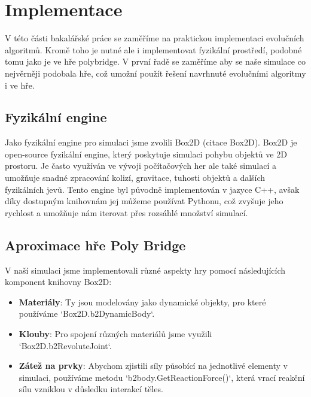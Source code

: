 \chapter{Implementace}

V této části bakalářské práce se zaměříme na praktickou implementaci evolučních algoritmů. Kromě toho je nutné ale i implementovat fyzikální prostředí, podobné tomu jako je ve hře polybridge. V první řadě se zaměříme aby se naše simulace co nejvěrněji podobala hře, což umožní použít řešení navrhnuté evolučními algoritmy i ve hře. 




\section{Fyzikální engine}

Jako fyzikální engine pro simulaci jsme zvolili Box2D (citace Box2D). Box2D je open-source fyzikální engine, který poskytuje simulaci pohybu objektů ve 2D prostoru. Je často využíván ve vývoji počítačových her ale také simulací a umožňuje snadné zpracování kolizí, gravitace, tuhosti objektů a dalších fyzikálních jevů. Tento engine byl původně implementován v jazyce C++, avšak díky dostupným knihovnám jej můžeme používat Pythonu, což zvyšuje jeho rychlost a umožňuje nám iterovat přes rozsáhlé množství simulací.

\section{Aproximace hře Poly Bridge}

V naší simulaci jsme implementovali různé aspekty hry pomocí následujících komponent knihovny Box2D:

\begin{itemize}
    \item \textbf{Materiály}: Ty jsou modelovány jako dynamické objekty, pro které používáme `Box2D.b2DynamicBody`.
    \item \textbf{Klouby}: Pro spojení různých materiálů jsme využili `Box2D.b2RevoluteJoint`.
    \item \textbf{Zátež na prvky}: Abychom zjistili síly působící na jednotlivé elementy v simulaci, používáme metodu `b2body.GetReactionForce()`, která vrací reakční sílu vzniklou v důsledku interakcí těles.
\end{itemize}

